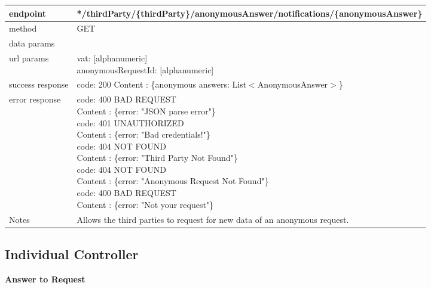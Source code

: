 	\begin{tabularx}{\linewidth}{| l| l }
		\hline
		endpoint & */thirdParty/\{thirdParty\}/anonymousAnswer/notifications/\{anonymousAnswer\} \\
		\hline
		method & GET \\
		\hline
		data params & \\
		\hline
		url params &
		\parbox{0.7\textwidth}{
			\bigskip
			vat: [alphanumeric]\\
			anonymousRequestId: [alphanumeric]
			\bigskip
		} \\
		\hline
		success response &
		\parbox{0.7\textwidth}{
			\bigskip
			code: 200\\
			Content : \{anonymous answers: List$<$AnonymousAnswer$>$\}
			\bigskip
		} \\
		\hline
		error response &
		\parbox{0.7\textwidth}{
			\bigskip
			code: 400 BAD REQUEST \\
			Content : \{error: "JSON parse error"\}\\
			code: 401 UNAUTHORIZED \\
			Content : \{error: "Bad credentials!"\}\\
			code: 404 NOT FOUND \\
			Content : \{error: "Third Party Not Found"\}\\
			code: 404 NOT FOUND \\
			Content : \{error: "Anonymous Request Not Found"\}\\
			code: 400 BAD REQUEST \\
			Content : \{error: "Not your request"\}\\
			\bigskip
		} \\
		\hline
		Notes & 
		\parbox{0.7\textwidth}{
			\bigskip Allows the third parties to request for new data of an anonymous request.
		\bigskip}  \\
		\hline
	\end{tabularx}
\newpage
\subsection{Individual Controller}

	\textbf{Answer to Request} \\

